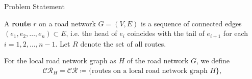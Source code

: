 \documentclass[aspectratio=169, bigfiles]{beamer}
\newcommand{\CR}{\mathcal{CR}}
\def\:={\coloneqq} %
\begin{document}
\begin{frame}{Problem Statement}
\begin{definition}[Route]
A \textbf{route} $r$ on a road network $G=(V,E)$ is a sequence of connected edges $(e_1,e_2,\dots,e_n)\subset E$, i.e. 
the head of $e_i$ coincides with the tail of $e_{i+1}$ for each $i = 1, 2, \dots, n-1$.
Let $R$ denote the set of all routes.
\end{definition}
\begin{definition}
For the local road network graph as $H$ of the road network $G$, we define 
\begin{align*}
    \CR_H = \CR \:= \{ \text{routes on a local road network graph $H$} \},
\end{align*}
\end{definition}
\end{frame}

\end{document}
